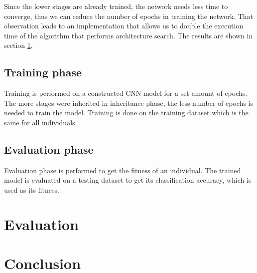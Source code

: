 \documentclass[eng]{simposium}
\begin{document}
Since the lower stages are already trained, the network needs less time to converge, thus we can reduce the number of epochs in training the network.
That observation leads to an implementation that allows us to double the execution time of the algorithm that performs architecture search.
The results are shown in section \ref{sec:eval}.

\subsection{Training phase}
Training is performed on a constructed CNN model for a set amount of epochs. 
The more stages were inherited in inheritance phase, the less number of epochs is needed to train the model.
Training is done on the training dataset which is the same for all individuals.

\subsection{Evaluation phase}
Evaluation phase is performed to get the fitness of an individual.
The trained model is evaluated on a testing dataset to get its classification accuracy, which is used as its fitness.


\section{Evaluation}
\label{sec:eval}



\section{Conclusion}
\end{document}
